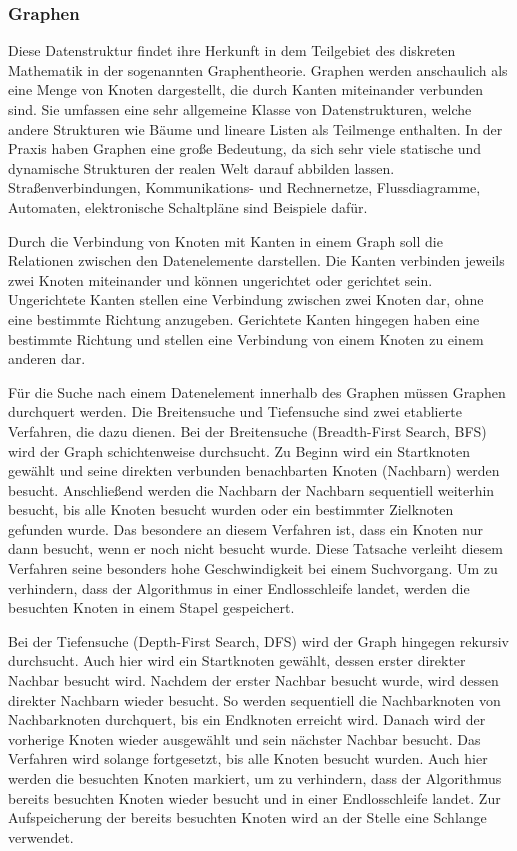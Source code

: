 \subsubsection{Graphen}
Diese Datenstruktur findet ihre Herkunft in dem Teilgebiet des diskreten Mathematik in der sogenannten Graphentheorie. Graphen werden anschaulich als eine Menge von Knoten dargestellt, die durch Kanten miteinander verbunden sind. Sie umfassen eine sehr allgemeine Klasse von Datenstrukturen, welche andere Strukturen wie Bäume und lineare Listen als Teilmenge enthalten. In der Praxis haben Graphen eine große Bedeutung, da sich sehr viele statische und dynamische Strukturen der realen Welt darauf abbilden lassen. Straßenverbindungen, Kommunikations- und Rechnernetze, Flussdiagramme, Automaten, elektronische Schaltpläne sind Beispiele dafür. \autocite[215]{knebl_algorithmen_2021} \autocite[654]{ernst_grundkurs_2020}

Durch die Verbindung von Knoten mit Kanten in einem Graph soll die Relationen zwischen den Datenelemente darstellen. Die Kanten verbinden jeweils zwei Knoten miteinander und können ungerichtet oder gerichtet sein. Ungerichtete Kanten stellen eine Verbindung zwischen zwei Knoten dar, ohne eine bestimmte Richtung anzugeben. Gerichtete Kanten hingegen haben eine bestimmte Richtung und stellen eine Verbindung von einem Knoten zu einem anderen dar. \autocite[221-222]{knebl_algorithmen_2021}

Für die Suche nach einem Datenelement innerhalb des Graphen müssen Graphen durchquert werden. Die Breitensuche und Tiefensuche sind zwei etablierte Verfahren, die dazu dienen. Bei der Breitensuche (Breadth-First Search, BFS) wird der Graph schichtenweise durchsucht. Zu Beginn wird ein Startknoten gewählt und seine direkten verbunden benachbarten Knoten (Nachbarn) werden besucht. Anschließend werden die Nachbarn der Nachbarn sequentiell weiterhin besucht, bis alle Knoten besucht wurden oder ein bestimmter Zielknoten gefunden wurde. Das besondere an diesem Verfahren ist, dass ein Knoten nur dann besucht, wenn er noch nicht besucht wurde. Diese Tatsache verleiht diesem Verfahren seine besonders hohe Geschwindigkeit bei einem Suchvorgang. Um zu verhindern, dass der Algorithmus in einer Endlosschleife landet, werden die besuchten Knoten in einem Stapel gespeichert. \autocite[227-228]{knebl_algorithmen_2021} \autocite[666]{ernst_grundkurs_2020}

Bei der Tiefensuche (Depth-First Search, DFS) wird der Graph hingegen rekursiv durchsucht. Auch hier wird ein Startknoten gewählt, dessen erster direkter Nachbar besucht wird. Nachdem der erster Nachbar besucht wurde, wird dessen direkter Nachbarn wieder besucht. So werden sequentiell die Nachbarknoten von Nachbarknoten durchquert, bis ein Endknoten erreicht wird. Danach wird der vorherige Knoten wieder ausgewählt und sein nächster Nachbar besucht. Das Verfahren wird solange fortgesetzt, bis alle Knoten besucht wurden. Auch hier werden die besuchten Knoten markiert, um zu verhindern, dass der Algorithmus bereits besuchten Knoten wieder besucht und in einer Endlosschleife landet. Zur Aufspeicherung der bereits besuchten Knoten wird an der Stelle eine Schlange verwendet. \autocite[231-232]{knebl_algorithmen_2021} \autocite[666]{ernst_grundkurs_2020}

